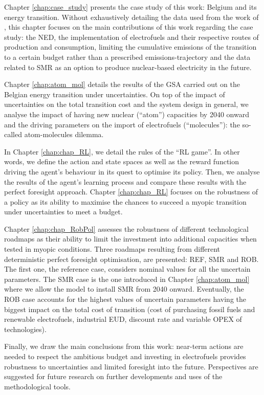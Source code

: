 Chapter \ref{chap:case_study} presents the case study of this work: Belgium and its energy transition. Without exhaustively detailing the data used from the work of \citet{limpens2021generating}, this chapter focuses on the main contributions of this work regarding the case study: the \gls{NED}, the implementation of electrofuels and their respective routes of production and consumption, limiting  the cumulative emissions of the transition to a certain  budget rather than a prescribed emissions-trajectory and the data related to \gls{SMR} as an option to produce nuclear-based electricity in the future.

Chapter \ref{chap:atom_mol} details the results of the \gls{GSA} carried out on the Belgian energy transition under uncertainties. On top of the impact of uncertainties on the total transition cost and the system design in general, we analyse the impact of having new nuclear (``atom'') capacities by 2040 onward and the driving parameters on the import of electrofuels (``molecules''): the so-called atom-molecules dilemma.

In Chapter \ref{chap:chap_RL}, we detail the rules of the ``\gls{RL} game''. In other words, we define the action and state spaces as well as the reward function driving the agent's behaviour in its quest to optimise its policy. Then, we analyse the results of the agent's learning process and compare these results with the perfect foresight approach.  Chapter \ref{chap:chap_RL} focuses on the robustness of a policy as its ability to maximise the chances to succeed a myopic transition under uncertainties to meet a  budget.

Chapter \ref{chap:chap_RobPol} assesses the robustness of different technological roadmaps as their ability to limit the investment into additional capacities when tested in myopic conditions. Three roadmaps resulting from different deterministic perfect foresight optimisation, are presented: REF, SMR and ROB. The first one, the reference case, considers nominal values for all the uncertain parameters. The SMR case is the one introduced in Chapter \ref{chap:atom_mol} where we allow the model to install \gls{SMR} from 2040 onward. Eventually, the ROB case accounts for the highest values of uncertain parameters having the biggest impact on the total cost of transition (\ie cost of purchasing fossil fuels and renewable electrofuels, industrial \gls{EUD}, discount rate and variable \gls{OPEX} of technologies).

Finally, we draw the main conclusions from this work: near-term actions are needed to respect the ambitious  budget and investing in electrofuels provides robustness to uncertainties and limited foresight into the future.  Perspectives are suggested for future research on further developments and uses of the methodological tools.


